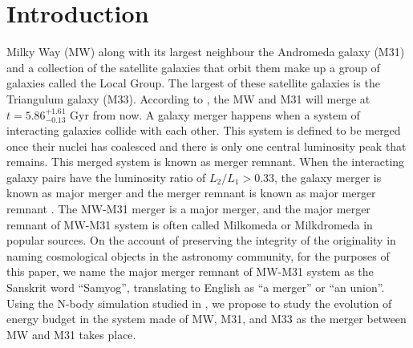 \documentclass[twocolumn]{aastex631}
\begin{document}

\author[0000-0001-7379-2625]{Jay Motka} 
\date{\today}



\vspace{-1cm}

\section{Introduction}
\label{sec:intro}

Milky Way (MW) along with its largest neighbour the Andromeda galaxy (M31) and a collection of the satellite galaxies that orbit them make up a group of galaxies called the Local Group. The largest of these satellite galaxies is the Triangulum galaxy (M33). According to \cite{simulation}, the MW and M31 will merge at $t = 5.86^{+1.61}_{-0.13}$ Gyr from now. A galaxy merger happens when a system of interacting galaxies collide with each other. This system is defined to be merged once their nuclei has coalesced and there is only one central luminosity peak that remains. This merged system is known as merger remnant. When the interacting galaxy pairs have the luminosity ratio of $L_2/L_1 > 0.33$, the galaxy merger is known as major merger and the merger remnant is known as major merger remnant \citep{major_merger_def}. The MW-M31 merger is a major merger, and the major merger remnant of MW-M31 system is often called Milkomeda or Milkdromeda in popular sources. On the account of preserving the integrity of the originality in naming cosmological objects in the astronomy community, for the purposes of this paper, we name the major merger remnant of MW-M31 system as the Sanskrit word ``Samyog'', translating to English as ``a merger'' or ``an union''. Using the N-body simulation studied in \cite{simulation}, we propose to study the evolution of energy budget in the system made of MW, M31, and M33 as the merger between MW and M31 takes place. 
\end{document}
